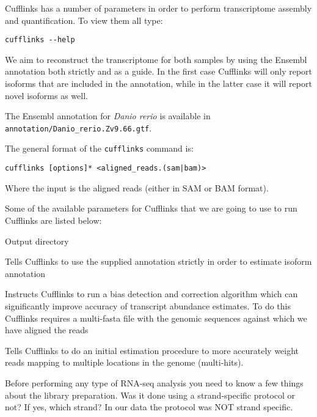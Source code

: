 \begin{steps}
Cufflinks has a number of parameters in order to perform transcriptome
assembly and quantification. To view them all type:

\begin{lstlisting}
cufflinks --help
\end{lstlisting}
\end{steps}

We aim to reconstruct the transcriptome for both samples by using the Ensembl
annotation both strictly and as a guide. In the first case Cufflinks will only
report isoforms that are included in the annotation, while in the latter case
it will report novel isoforms as well.

The Ensembl annotation for \textit{Danio rerio} is available in
\texttt{annotation/Danio\_rerio.Zv9.66.gtf}.

\begin{information}
The general format of the \texttt{cufflinks} command is:
\begin{lstlisting}
cufflinks [options]* <aligned_reads.(sam|bam)>
\end{lstlisting}
Where the input is the aligned reads (either in SAM or BAM format).
\end{information}

\begin{note}
Some of the available parameters for Cufflinks that we are going to use to run
Cufflinks are listed below:
\begin{description}[style=multiline,labelindent=0cm,align=right,leftmargin=\descriptionlabelspace,rightmargin=1.5cm,font=\ttfamily]
  \item[-o] Output directory
  \item[-G] Tells Cufflinks to use the supplied annotation strictly in order
  to estimate isoform annotation
  \item[-b] Instructs Cufflinks to run a bias detection and correction algorithm
  which can significantly improve accuracy of transcript abundance estimates.
  To do this Cufflinks requires a multi-fasta file with the genomic sequences
  against which we have aligned the reads
  \item[-u] Tells Cufflinks to do an initial estimation procedure to more
  accurately weight reads mapping to multiple locations in the genome
  (multi-hits). 
  \item[--library-type] Before performing any type of RNA-seq analysis you need
  to know a few things about the library preparation. Was it done using a
  strand-specific protocol or not? If yes, which strand? In our data the protocol
  was NOT strand specific.
\end{description}
\end{note}

